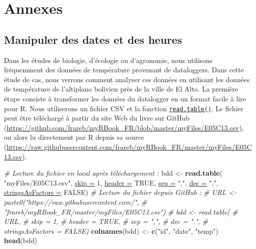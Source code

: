 \documentclass[twoside,symmetric]{book}
\newenvironment{Shaded}{}{}
\newcommand{\CommentTok}[1]{\textit{#1}}
\newcommand{\DataTypeTok}[1]{\underline{#1}}
\newcommand{\DecValTok}[1]{#1}
\newcommand{\KeywordTok}[1]{\textbf{#1}}
\newcommand{\NormalTok}[1]{#1}
\newcommand{\OtherTok}[1]{#1}
\newcommand{\StringTok}[1]{#1}
\begin{document}
\hypertarget{part-annexes}{%
\part{Annexes}\label{part-annexes}}

\hypertarget{studyCase001}{%
\chapter{Manipuler des dates et des heures}\label{studyCase001}}

Dans les études de biologie, d'écologie ou d'agronomie, nous utilisons fréquemment des données de température provenant de dataloggers. Dans cette étude de cas, nous verrons comment analyser ces données en utilisant les données de température de l'altiplano bolivien près de la ville de El Alto. La première étape consiste à transformer les données du datalogger en un format facile à lire pour R. Nous utiliserons un fichier CSV et la fonction \protect\hyperlink{import}{\texttt{read.table()}}. Le fichier peut être téléchargé à partir du site Web du livre sur GitHub (\url{https://github.com/frareb/myRBook_FR/blob/master/myFiles/E05C13.csv}), ou alors lu directement par R depuis sa source (\url{https://raw.githubusercontent.com/frareb/myRBook_FR/master/myFiles/E05C13.csv}).

\begin{Shaded}
\begin{Highlighting}[]
\CommentTok{# Lecture du fichier en local après téléchargement : }
\NormalTok{bdd <-}\StringTok{ }\KeywordTok{read.table}\NormalTok{(}
  \StringTok{"myFiles/E05C13.csv"}\NormalTok{, }
  \DataTypeTok{skip =} \DecValTok{1}\NormalTok{, }\DataTypeTok{header =} \OtherTok{TRUE}\NormalTok{, }
  \DataTypeTok{sep =} \StringTok{","}\NormalTok{, }\DataTypeTok{dec =} \StringTok{"."}\NormalTok{, }
  \DataTypeTok{stringsAsFactors =} \OtherTok{FALSE}\NormalTok{)}
\CommentTok{# Lecture du fichier depuis GitHub : }
\CommentTok{# URL <- paste0("https://raw.githubusercontent.com/",}
\CommentTok{#   "frareb/myRBook_FR/master/myFiles/E05C13.csv")}
\CommentTok{# bdd <- read.table(}
\CommentTok{#   URL, }
\CommentTok{#   skip = 1, }
\CommentTok{#   header = TRUE,}
\CommentTok{#   sep = ",",}
\CommentTok{#   dec = ".",}
\CommentTok{#   stringsAsFactors = FALSE)}
\KeywordTok{colnames}\NormalTok{(bdd) <-}\StringTok{ }\KeywordTok{c}\NormalTok{(}\StringTok{"id"}\NormalTok{, }\StringTok{"date"}\NormalTok{, }\StringTok{"temp"}\NormalTok{)}
\KeywordTok{head}\NormalTok{(bdd)}
\end{Highlighting}
\end{Shaded}
\end{document}
